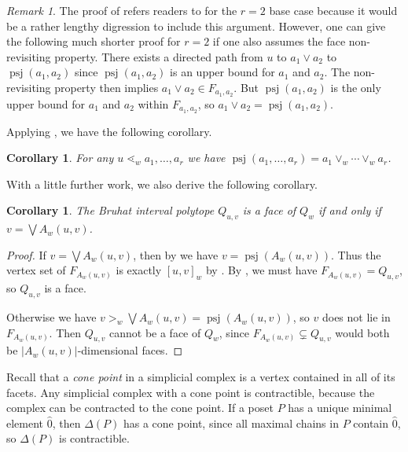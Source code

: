 \documentclass[12pt]{amsart}
\theoremstyle{plain}
\newtheorem{cor}[thm]{Corollary}
\theoremstyle{definition}
\theoremstyle{remark}
\newtheorem{remark}[thm]{Remark}
\DeclareMathOperator{\psj}{psj}
\begin{document}
\begin{remark}
The proof of  refers readers to \cite[Thm.~4.6 and Thm.~5.13]{He} for the $r=2$ base case because it would be a rather lengthy digression to include this argument.  However, one can give the following much shorter proof for $r=2$ if one also assumes the face non-revisiting property. There exists a directed path from $u$ to $a_1\vee a_2$ to  $\psj(a_1,a_2)$ since $\psj(a_1,a_2)$ is an upper bound for $a_1$ and $a_2$.  The non-revisiting property then implies $a_1\vee a_2 \in F_{a_1,a_2}$.  But 
$\psj(a_1,a_2)$ is the only upper bound for $a_1$ and $a_2$ within $F_{a_1,a_2}$, so  $a_1\vee a_2 = \psj(a_1,a_2)$.
\end{remark}

Applying , we have the following corollary.

\begin{cor}\label{cor:Bruhat-join-equals-pseudo}
For any $u \lessdot_w a_1,\ldots,a_r$ we have $\psj(a_1,\ldots,a_r)=a_1 \vee_w \cdots \vee_w a_r$.
\end{cor}

With a little further work, we also derive the following corollary.

\begin{cor}\label{cor:face-description} 
The Bruhat interval polytope $Q_{u,v}$ is a face of $Q_w$ if and only if $v=\bigvee A_w(u,v)$.
\end{cor}

\begin{proof}
If $v=\bigvee A_w(u,v)$, then by  we have $v=\psj(A_w(u,v))$. Thus the vertex set of $F_{A_w(u,v)}$ is exactly $[u,v]_w$ by . By , we must have $F_{A_w(u,v)}=Q_{u,v}$, so $Q_{u,v}$ is a face.

Otherwise we have $v>_w\bigvee A_w(u,v)=\psj(A_w(u,v))$, so $v$ does not lie in $F_{A_w(u,v)}$. Then $Q_{u,v}$ cannot be a face of $Q_w$, since $F_{A_w(u,v)} \subsetneq Q_{u,v}$ would both be $|A_w(u,v)|$-dimensional faces.
\end{proof}

Recall that a \emph{cone point} in a simplicial complex is a vertex contained in all of its facets.  Any simplicial complex with a cone point is contractible, because the complex can be contracted to the cone point. If a poset $P$ has a unique minimal element $\hat{0}$, then $\Delta(P)$ has a cone point, since all maximal chains in $P$ contain $\hat{0}$, so $\Delta(P)$ is contractible.
\end{document}
